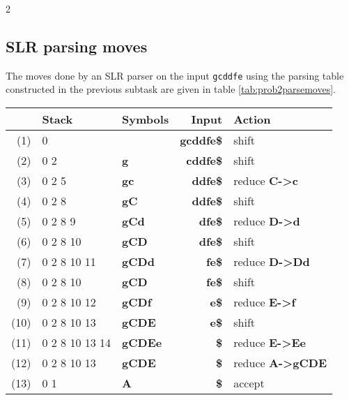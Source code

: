 \documentclass[twoside]{article}
\begin{document}
\begin{multicols}{2}
    \subsection{SLR parsing moves}

    The moves done by an SLR parser on the input \texttt{gcddfe} using the parsing table constructed in the previous subtask are given in table \ref{tab:prob2parsemoves}.

    \begin{table*}[b]
        \centering
        \begin{tabular}{|r|l|l|r|l|}
            \hline
            ~    & Stack & Symbols & Input & Action \\ \hline
            (1)  & 0 & ~ & \textbf{gcddfe\$} & shift \\ \hline
            (2)  & 0 2 & \textbf{g} & \textbf{cddfe\$} & shift \\ \hline
            (3)  & 0 2 5 & \textbf{gc} & \textbf{ddfe\$} & reduce \textbf{C->c} \\ \hline
            (4)  & 0 2 8 & \textbf{gC} & \textbf{ddfe\$} & shift \\ \hline
            (5)  & 0 2 8 9 & \textbf{gCd} & \textbf{dfe\$} & reduce \textbf{D->d} \\ \hline
            (6)  & 0 2 8 10 & \textbf{gCD} & \textbf{dfe\$} & shift \\ \hline
            (7)  & 0 2 8 10 11 & \textbf{gCDd} & \textbf{fe\$} & reduce \textbf{D->Dd} \\ \hline
            (8)  & 0 2 8 10 & \textbf{gCD} & \textbf{fe\$} & shift \\ \hline
            (9)  & 0 2 8 10 12 & \textbf{gCDf} & \textbf{e\$} & reduce \textbf{E->f} \\ \hline
            (10) & 0 2 8 10 13 & \textbf{gCDE} & \textbf{e\$} & shift \\ \hline
            (11) & 0 2 8 10 13 14 & \textbf{gCDEe} & \textbf{\$} & reduce \textbf{E->Ee} \\ \hline
            (12) & 0 2 8 10 13 & \textbf{gCDE} & \textbf{\$} & reduce \textbf{A->gCDE} \\ \hline
            (13) & 0 1 & \textbf{A} & \textbf{\$} & accept \\ \hline
        \end{tabular}
        \caption{SLR parser moves on the input \textbf{gcddfe}.} \label{tab:prob2parsemoves}
    \end{table*}
\end{multicols}
\end{document}
